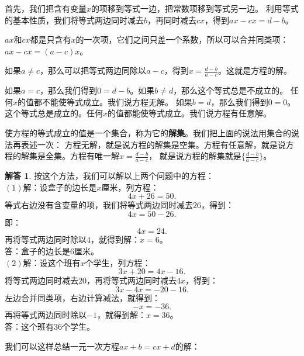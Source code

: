 \documentclass[12pt,UTF8]{ctexbook}
\theoremstyle{definition}
\newtheorem*{so}{解答}
\theoremstyle{plain}
\begin{document}
首先，我们把含有变量$x$的项移到等式一边，把常数项移到等式另一边。
利用等式的基本性质，我们将等式两边同时减去$b$，再同时减去$cx$，得到$ax-cx=d-b$。

$ax$和$cx$都是只含有$x$的一次项，它们之间只差一个系数，所以可以合并同类项：$ax - cx = (a - c)x$。

如果$a\neq c$，那么可以把等式两边同除以$a-c$，得到$x = \frac{d-b}{a-c}$。这就是方程的解。

如果$a = c$，那么我们得到$0 = d-b$。如果$b\neq d$，那么这个等式总是不成立的。
任何$x$的值都不能使等式成立。我们说方程无解。
如果$b = d$，那么我们得到$0 = 0$。这个等式总是成立的。任何$x$的值都能使等式成立。我们说方程有任意解。

使方程的等式成立的值是一个集合，称为它的\textbf{解集}。我们把上面的说法用集合的说法再表述一次：
方程无解，就是说方程的解集是空集。方程有任意解，就是说方程的解集是全集。方程有唯一解$x = \frac{d-b}{a-c}$，
就是说方程的解集就是$\{\frac{d-b}{a-c}\}$。
\begin{so}
    按这个方法，我们可以解以上两个问题中的方程：\\
    $(1)$解：设盒子的边长是$x$厘米，列方程：
    $$ 4x + 26 = 50.$$
    等式右边没有含变量的项，我们将等式两边同时减去$26$，得到：
    $$ 4x = 50 - 26.$$
    即：
    $$ 4x = 24. $$
    再将等式两边同时除以$4$，就得到解：$x=6$。\\
    答：盒子的边长是$6$厘米。\\
    $(2)$解：设这个班有$x$个学生，列方程：
    $$ 3x + 20 = 4x - 16.$$
    将等式两边同时减去$20$，再将等式两边同时减去$4x$，得到：
    $$ 3x - 4x = -20 - 16.$$
    左边合并同类项，右边计算减法，就得到：
    $$ -x = -36. $$
    再将等式两边同时除以$-1$，就得到解：$x = 36$。\\
    答：这个班有$36$个学生。
\end{so}
我们可以这样总结一元一次方程$ax+b=cx+d$的解：
\begin{center}
\end{center}
\end{document}
